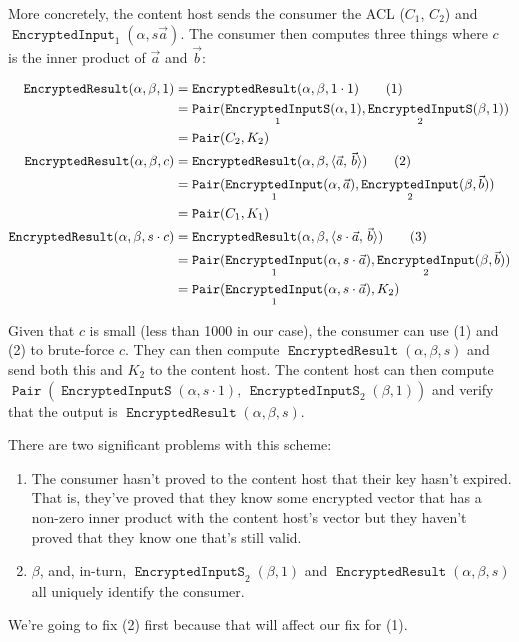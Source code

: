 \documentclass[pdftex,12pt,a4papaer,twoside,notitlepage]{report}
\DeclareMathOperator{\ein}{\mathtt{EncryptedInput}}
\DeclareMathOperator{\pair}{\mathtt{Pair}}
\DeclareMathOperator{\eins}{\mathtt{EncryptedInputS}}
\DeclareMathOperator{\eout}{\mathtt{EncryptedResult}}
\begin{document}
More concretely, the content host sends the consumer the ACL ($C_1$, $C_2$) and
$\ein_1(\alpha, s\vec{a})$. The consumer then computes three things where $c$ is
the inner product of $\vec{a}$ and $\vec{b}$:

\begin{align*}
  \eout(\alpha, \beta, 1) &= \eout(\alpha, \beta, 1 \cdot 1)  \tag{1} \\
                          &= \pair(\eins_1(\alpha, 1), \eins_2(\beta, 1)) \\
                          &= \pair(C_2, K_2) \\
  \eout(\alpha, \beta, c) &= \eout(\alpha, \beta, \iprod{\vec{a}}{\vec{b}}) \tag{2} \\
                          &= \pair(\ein_1(\alpha, \vec{a}), \ein_2(\beta, \vec{b})) \\
                          &= \pair(C_1, K_1) \\
  \eout(\alpha, \beta, s \cdot c) &= \eout(\alpha, \beta, \iprod{s \cdot \vec{a}}{\vec{b}}) \tag{3} \\
                          &= \pair(\ein_1(\alpha, s \cdot \vec{a}), \ein_2(\beta, \vec{b})) \\
                          &= \pair(\ein_1(\alpha, s \cdot \vec{a}), K_2) \\
\end{align*}

Given that $c$ is small (less than 1000 in our case), the consumer can use (1)
and (2) to brute-force $c$. They can then compute $\eout(\alpha, \beta, s)$ and
send both this and $K_2$ to the content host. The content host can then
compute $\pair(\eins(\alpha, s \cdot 1),\,\eins_2(\beta, 1))$ and verify that the
output is $\eout(\alpha, \beta, s)$.

There are two significant problems with this scheme:

\begin{enumerate}
\item The consumer hasn't proved to the content host that their key hasn't
  expired. That is, they've proved that they know some encrypted vector that has
  a non-zero inner product with the content host's vector but they haven't
  proved that they know one that's still valid.
\item $\beta$, and, in-turn, $\eins_2(\beta, 1)$ and $\eout(\alpha, \beta, s)$ all
  uniquely identify the consumer.
\end{enumerate}

We're going to fix (2) first because that will affect our fix for (1).
\end{document}
